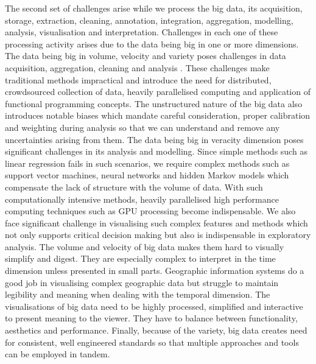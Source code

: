 The second set of challenges arise while we process the big data, its acquisition, storage, extraction, cleaning, annotation, integration, aggregation, modelling, analysis, visualisation and interpretation.
Challenges in each one of these processing activity arises due to the data being big in one or more dimensions.
The data being big in volume, velocity and variety poses challenges in data acquisition, aggregation, cleaning and analysis \cite{li2016geospatial}. 
These challenges make traditional methods impractical and introduce the need for distributed, crowdsourced collection of data, heavily parallelised computing and application of functional programming concepts.
The unstructured nature of the big data also introduces notable biases which mandate careful consideration, proper calibration and weighting during analysis so that we can understand and remove any uncertainties arising from them.
The data being big in veracity dimension poses significant challenges in its analysis and modelling.
Since simple methods such as linear regression fails in such scenarios, we require complex methods such as support vector machines, neural networks and hidden Markov models which compensate the lack of structure with the volume of data.
With such computationally intensive methods, heavily parallelised high performance computing techniques such as GPU processing become indispensable.
We also face significant challenge in visualising such complex features and methods which not only supports critical decision making but also is indispensable in exploratory analysis.
The volume and velocity of big data makes them hard to visually simplify and digest.
They are especially complex to interpret in the time dimension unless presented in small parts.
Geographic information systems do a good job in visualising complex geographic data but struggle to maintain legibility and meaning when dealing with the temporal dimension.
The visualisations of big data need to be highly processed, simplified and interactive to present meaning to the viewer. 
They have to balance between functionality, aesthetics and performance.
Finally, because of the variety, big data creates need for consistent, well engineered standards so that multiple approaches and tools can be employed in tandem.



